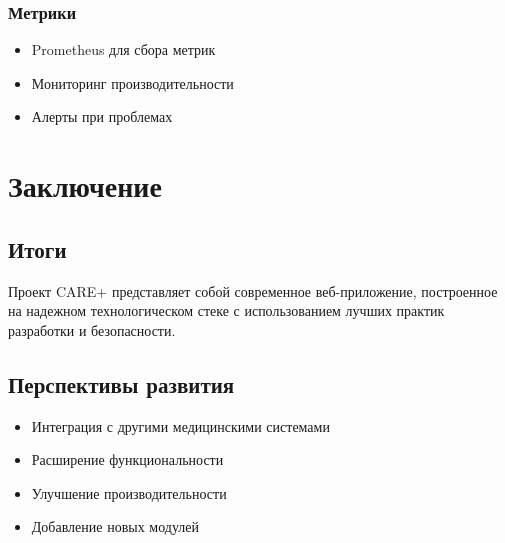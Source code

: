 \documentclass[12pt,a4paper]{article}
\begin{document}
\subsubsection{Метрики}
\begin{itemize}
    \item Prometheus для сбора метрик
    \item Мониторинг производительности
    \item Алерты при проблемах
\end{itemize}

\section{Заключение}
\subsection{Итоги}
Проект CARE+ представляет собой современное веб-приложение, построенное на надежном технологическом стеке с использованием лучших практик разработки и безопасности.

\subsection{Перспективы развития}
\begin{itemize}
    \item Интеграция с другими медицинскими системами
    \item Расширение функциональности
    \item Улучшение производительности
    \item Добавление новых модулей
\end{itemize}
\end{document}
